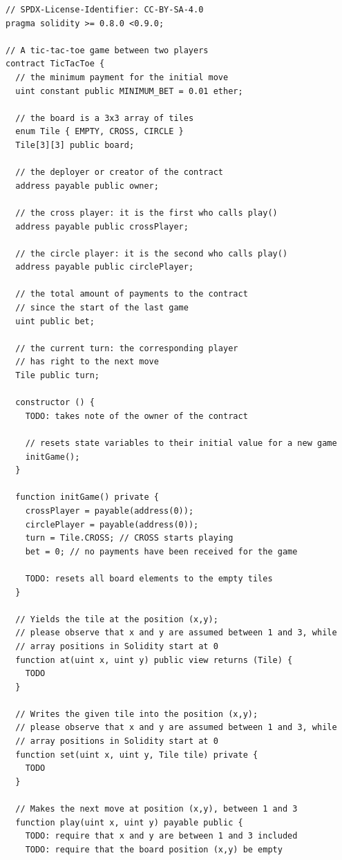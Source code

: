 \documentclass{article}
\begin{document}
\begin{lstlisting}[language=Solidity,numbers=none]
// SPDX-License-Identifier: CC-BY-SA-4.0
pragma solidity >= 0.8.0 <0.9.0;

// A tic-tac-toe game between two players
contract TicTacToe {
  // the minimum payment for the initial move
  uint constant public MINIMUM_BET = 0.01 ether;

  // the board is a 3x3 array of tiles
  enum Tile { EMPTY, CROSS, CIRCLE }
  Tile[3][3] public board;

  // the deployer or creator of the contract
  address payable public owner;

  // the cross player: it is the first who calls play()
  address payable public crossPlayer;

  // the circle player: it is the second who calls play()
  address payable public circlePlayer;

  // the total amount of payments to the contract
  // since the start of the last game
  uint public bet;

  // the current turn: the corresponding player
  // has right to the next move
  Tile public turn;

  constructor () {
    TODO: takes note of the owner of the contract

    // resets state variables to their initial value for a new game
    initGame();
  }

  function initGame() private {
    crossPlayer = payable(address(0));
    circlePlayer = payable(address(0));
    turn = Tile.CROSS; // CROSS starts playing
    bet = 0; // no payments have been received for the game

    TODO: resets all board elements to the empty tiles
  }

  // Yields the tile at the position (x,y);
  // please observe that x and y are assumed between 1 and 3, while
  // array positions in Solidity start at 0
  function at(uint x, uint y) public view returns (Tile) {
    TODO
  }

  // Writes the given tile into the position (x,y);
  // please observe that x and y are assumed between 1 and 3, while
  // array positions in Solidity start at 0
  function set(uint x, uint y, Tile tile) private {
    TODO
  }

  // Makes the next move at position (x,y), between 1 and 3
  function play(uint x, uint y) payable public {
    TODO: require that x and y are between 1 and 3 included
    TODO: require that the board position (x,y) be empty


\end{lstlisting}
\end{document}

